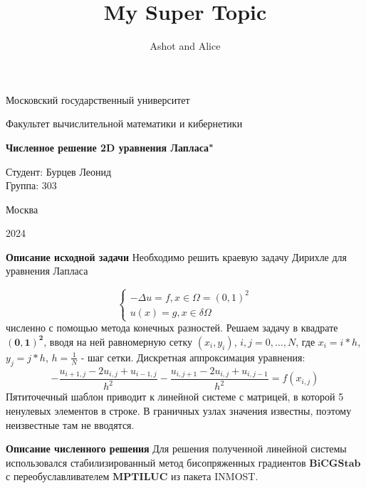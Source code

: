 \documentclass{beamer}
\title{My Super Topic}
\author{Ashot and Alice}
\begin{document}
\begin{frame}
\thispagestyle{empty}
\centerline{Московский государственный университет}
\vfill
\centerline{Факультет вычислительной математики и кибернетики}
\vfill
\vfill
\vfill
\vfill
\Large
\begin{centering}
{\bfseries Численное решение 2D уравнения Лапласа"}
\end{centering}
\normalsize
\vfill
\vfill
\vfill
\begin{flushright}
Студент: Бурцев Леонид\\
Группа: 303
\end{flushright}
\vfill
\vfill
\centerline{Москва}
\centerline{2024}
\pagebreak
\end{frame}

\begin{frame}
\textbf{Описание исходной задачи}
\newline
Необходимо решить краевую задачу Дирихле для уравнения Лапласа

\begin{equation*}
 \begin{cases}
   - \Delta u = f, x \in \Omega = (0, 1)^{2}\\
   u(x) = g, x \in \delta \Omega
 \end{cases}
\end{equation*}
численно с помощью метода конечных разностей.
\newline
Решаем задачу в квадрате $\mathbf{(0, 1)^{2}}$, вводя на ней равномерную сетку ${(x_i, y_i)}$, $i,j = 0, \ldots , N$, где 
$x_i = i * h$,
$y_j = j * h$,
$h = \frac{1}{N}$ - шаг сетки.
\newline
Дискретная аппроксимация уравнения:
$$-\frac{u_{i+1,j}-2u_{i,j}+u_{i-1,j}}{h^{2}} -\frac{u_{i,j+1}-2u_{i,j}+u_{i,j-1}}{h^{2}} = f(x_{i,j})$$
Пятиточечный шаблон приводит к линейной системе с матрицей, в которой 5 ненулевых элементов в строке.
\newline
В граничных узлах значения известны, поэтому неизвестные там не вводятся.
\end{frame}

\begin{frame}
\textbf{Описание численного решения}
\newline
Для решения полученной линейной системы использовался стабилизированный метод бисопряженных градиентов $\textbf{BiCGStab}$ с переобуславливателем $\textbf{MPTILUC}$ из пакета INMOST.

\end{frame}
\end{document}
